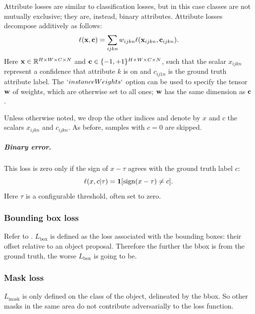 Attribute losses are similar to classification losses, but in this case classes are not mutually exclusive; they are, instead, binary attributes. Attribute losses decompose additively as follows:
\begin{equation}\label{e:addlossattribute}
\ell(\mathbf{x},\mathbf{c}) = \sum_{ijkn} w_{ijkn} \ell(\mathbf{x}_{ijkn}, \mathbf{c}_{ijkn}).
\end{equation}
Here $\mathbf{x}\in \mathbb{R}^{H \times W \times C \times N}$ and $\mathbf{c} \in \{-1,+1\}^{H \times W \times C \times N}$, such that the scalar $x_{ijkn}$ represent a confidence that attribute $k$ is on and $c_{ij1n}$ is the ground truth attribute label. The $`instanceWeights`$ option can be used to specify the tensor $\mathbf{w}$ of weights, which are otherwise set to all ones; $\mathbf{w}$ has the same dimension as $\mathbf{c}$.

Unless otherwise noted, we drop the other indices and denote by $x$ and $c$  the scalars $x_{ijkn}$ and  $c_{ijkn}$. As before, samples with $c=0$ are skipped.

\subparagraph{Binary error.} This loss is zero only if the sign of $x - \tau$ agrees with the ground truth label $c$:
\begin{equation}\label{e:loss-binary}
\ell(x,c|\tau) = \mathbf{1}[\sign(x-\tau) \not= c].
\end{equation}
Here $\tau$ is a configurable threshold, often set to zero.


\subsubsection{Bounding box loss}\label{s:loss-bb}

Refer to . $L_\textrm{box}$ is defined as the loss associated with the bounding boxes: their offset relative to an object proposal.
Therefore the further the bbox is from the ground truth, the worse $L_\textrm{box}$ is going to be.


\subsubsection{Mask loss}\label{s:loss-mask}

$L_\textrm{mask}$ is only defined on the class of the object, delineated by the bbox. So other masks in the same area do not contribute adversarially to the loss function.

